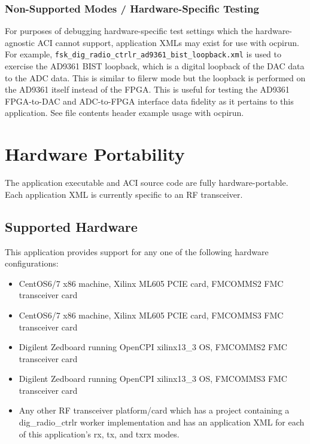 \begin{landscape}
      \subsubsection{Non-Supported Modes / Hardware-Specific Testing}

        For purposes of debugging hardware-specific test settings which the
        hardware-agnostic ACI cannot support, application XMLs may exist for use
        with ocpirun. For example,
        \texttt{fsk\_dig\_radio\_ctrlr\_ad9361\_bist\_loopback.xml} is used
        to exercise the AD9361 BIST loopback, which is a digital loopback of
        the DAC data to the ADC data. This is similar to filerw mode but the
        loopback is performed on the AD9361 itself instead of the FPGA. This
        is useful for testing the AD9361 FPGA-to-DAC and ADC-to-FPGA interface
        data fidelity as it pertains to this application. See file contents
        header example usage with ocpirun.

\end{landscape}

\section{Hardware Portability}

  The application executable and ACI source code are fully hardware-portable.
  Each application XML is
  currently specific
  to an RF transceiver.

  \subsection{Supported Hardware}
    This application provides support for
    any one of the following hardware configurations:
    \begin{itemize}
      \item CentOS6/7 x86 machine, Xilinx ML605 PCIE card, FMCOMMS2 FMC
        transceiver card
      \item CentOS6/7 x86 machine, Xilinx ML605 PCIE card, FMCOMMS3 FMC
        transceiver card
      \item Digilent Zedboard running OpenCPI xilinx13\_3 OS, FMCOMMS2 FMC
        transceiver card
      \item Digilent Zedboard running OpenCPI xilinx13\_3 OS, FMCOMMS3 FMC
        transceiver card
      \item Any other RF transceiver platform/card which has a project
        containing a
        dig\_radio\_ctrlr worker implementation and has an application
        XML for each of this application's rx, tx, and txrx modes.
    \end{itemize}

